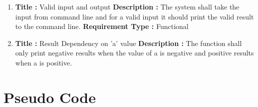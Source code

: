 \documentclass[a4paper, 11pt]{article}
\begin{document}
\begin{enumerate}
    \item \textbf{Title :} Valid input and output \newline
    \textbf{Description : } The system shall take the input from command line and for a valid input it should print the valid result to the command line.
    \newline
    \textbf{Requirement Type : } Functional
    
    \item \textbf{Title :} Result Dependency on 'a' value \newline 
    \textbf{Description : } The function shall only print negative results when the value of a is negative and positive results when a is positive.
    
\end{enumerate}
\newpage
\section{Pseudo Code}
\end{document}
